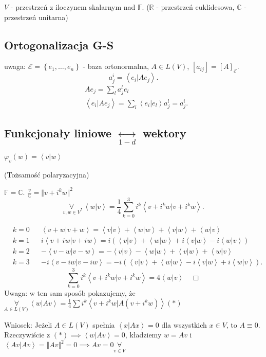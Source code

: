 \documentclass[../main.tex]{subfiles}
\begin{document}
$V$ - przestrzeń z iloczynem skalarnym nad $\mathbb{F}$. ($\mathbb{R}$ - przestrzeń euklidesowa, $\mathbb{C}$ - przestrzeń unitarna)
\subsection{Ortogonalizacja G-S}
uwaga: $\mathcal{E} = \left\{ e_1,\ldots,e_n \right\} $ - baza ortonormalna, $A\in L(V)$, $[a_{ij}] = [A]_\mathcal{E}$.\\
\[
a^i_j = \left<e_i|Ae_j \right>
.\]
\begin{align*}
    &A e_j = \sum_l a^l_j e_l\\
    &\left<e_i | Ae_j \right> = \sum_l \left<e_i | e_l \right> a^l_j = a^i_j
.\end{align*}
\subsection{Funkcjonały liniowe $\underset{1-d}{\leftrightarrow}$ wektory}
$\varphi_v(w) = \left<v|w \right>$
\begin{stw}
    (Tożsamość polaryzacyjna)

    $\mathbb{F} = \mathbb{C}$. $\frac{v}{\mathbb{C}} = \Vert v+i^k w \Vert ^2$
    \[
        \underset{v,w\in V}{\forall} , \left<w|v \right> = \frac{1}{4} \sum_{k=0}^3 i^k \left<v+i^k w| v+i^k w \right>
    .\]
\end{stw}
\begin{dowod}
    \begin{align*}
        &k=0 &&\left<v+w|v+w \right> = \left<v|v \right> + \left<w|w \right>+\left<v|w \right>+\left<w|v \right>\\
        &k = 1 && i\left<v+iw | v+iw\right> = i \left( \left<v|v \right> + \left<w|w \right> + i\left<v|w \right> - i\left<w|v \right> \right)\\
        &k = 2 && -\left<v-w|v-w \right> = -\left<v|v \right> - \left<w|w \right> + \left<v|w \right> + \left<w|v \right>\\
        &k = 3 && -i \left<v-iw|v-iw \right> = -i \left( \left<v|v \right> + \left<w|w \right> - i\left<v|w \right> + i\left<w|v \right> \right)
    .\end{align*}
    \[
    \sum_{k=0}^3 i^k \left<v+i^k w | v + i^k w \right> = 4\left<w|v \right>\quad\Box
    \]
    Uwaga: w ten sam sposób pokazujemy, że $\underset{A\in L(V)}{\forall} \left<w|Av \right> = \frac{1}{4}\sum i^k \left<v+i^kw|A(v+i^kw) \right>(*)$
\end{dowod}
Wniosek: Jeżeli $A\in L(V)$ spełnia $\left<x|Ax \right> = 0$ dla wszystkich $x\in V$, to $A \equiv 0$.\\
Rzeczywiście z  $(*) \implies \left<w|Av \right> = 0$, kładziemy $w = Av$ i $\left<Av|Av \right> = \Vert Av \Vert ^2 = 0 \implies Av = 0 \underset{v\in V}{\forall} $
\end{document}
